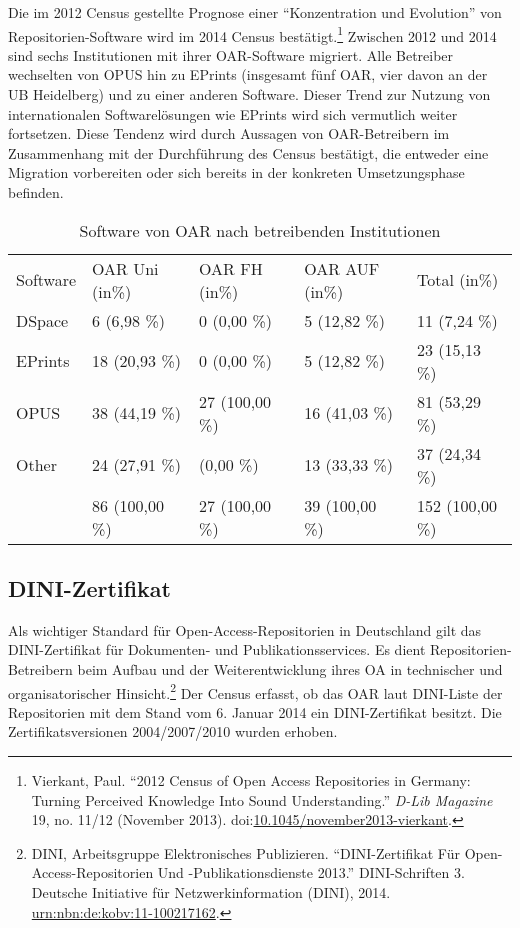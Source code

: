\documentclass[a4paper,
fontsize=11pt,
oneside,
numbers=noperiodatend,
parskip=half-,
bibliography=totoc,
final
]{scrartcl}
\begin{document}
Die im 2012 Census gestellte Prognose einer \enquote{Konzentration und
Evolution} von Repositorien-Software wird im 2014 Census
bestätigt.\footnote{Vierkant, Paul. \enquote{2012 Census of Open Access
  Repositories in Germany: Turning Perceived Knowledge Into Sound
  Understanding.} \emph{D-Lib Magazine} 19, no. 11/12 (November 2013).
  doi:\href{http://doi.org/10.1045/november2013-vierkant}{10.1045/november2013-vierkant}.}
Zwischen 2012 und 2014 sind sechs Institutionen mit ihrer OAR-Software
migriert. Alle Betreiber wechselten von OPUS hin zu EPrints (insgesamt
fünf OAR, vier davon an der UB Heidelberg) und zu einer anderen
Software. Dieser Trend zur Nutzung von internationalen Softwarelösungen
wie EPrints wird sich vermutlich weiter fortsetzen. Diese Tendenz wird
durch Aussagen von OAR-Betreibern im Zusammenhang mit der Durchführung
des Census bestätigt, die entweder eine Migration vorbereiten oder sich
bereits in der konkreten Umsetzungsphase befinden.

\begin{table}[ht]
\centering
\begin{tabular}{lllll}
  \toprule
Software & OAR Uni (in\%)   & OAR FH (in\%)  & OAR AUF (in\%)  & Total (in\%) \\  
\cmidrule(r){1-1} \cmidrule(r){2-2} \cmidrule(r){3-3} \cmidrule(r){4-4} \cmidrule(r){5-5}
DSpace & 6 (6,98 \%) & 0 (0,00 \%) & 5 (12,82 \%) & 11 (7,24 \%) \\ 
  EPrints & 18 (20,93 \%) & 0 (0,00 \%) & 5 (12,82 \%) & 23 (15,13 \%) \\ 
  OPUS & 38 (44,19 \%) & 27 (100,00 \%) & 16 (41,03 \%) & 81 (53,29 \%) \\ 
  Other & 24 (27,91 \%) & (0,00 \%) & 13 (33,33 \%) & 37 (24,34 \%) \\ 
  \cmidrule(r){1-1} \cmidrule(r){2-2} \cmidrule(r){3-3} \cmidrule(r){4-4} \cmidrule(r){5-5}
   & 86 (100,00 \%) & 27 (100,00 \%) & 39 (100,00 \%) & 152 (100,00 \%) \\ 
   \bottomrule
\end{tabular}
\caption{Software von OAR nach betreibenden Institutionen}
\end{table}

\subsection*{DINI-Zertifikat}\label{dini-zertifikat}

Als wichtiger Standard für Open-Access-Repositorien in Deutschland gilt
das DINI-Zertifikat für Dokumenten- und Publikationsservices. Es dient
Repositorien-Betreibern beim Aufbau und der Weiterentwicklung ihres OA
in technischer und organisatorischer Hinsicht.\footnote{DINI,
  Arbeitsgruppe Elektronisches Publizieren. \enquote{DINI-Zertifikat Für
  Open-Access-Repositorien Und -Publikationsdienste 2013.}
  DINI-Schriften 3. Deutsche Initiative für Netzwerkinformation (DINI),
  2014.
  \href{http://nbn-resolving.de/urn:nbn:de:kobv:11-100217162}{urn:nbn:de:kobv:11-100217162}.}
Der Census erfasst, ob das OAR laut DINI-Liste der Repositorien mit dem
Stand vom 6. Januar 2014 ein DINI-Zertifikat besitzt. Die
Zertifikatsversionen 2004/2007/2010 wurden erhoben.
\end{document}
